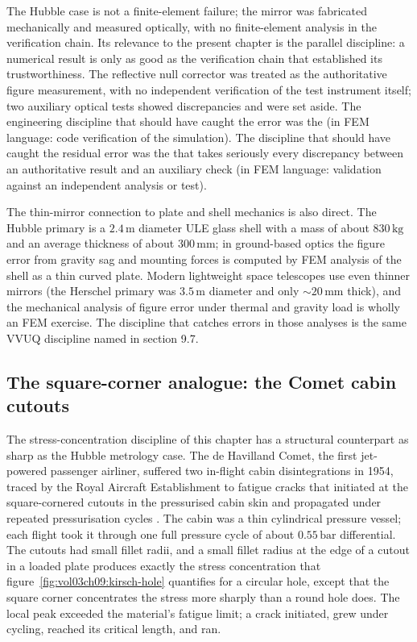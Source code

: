 The Hubble case is not a finite-element failure; the mirror was
fabricated mechanically and measured optically, with no
finite-element analysis in the verification chain. Its relevance
to the present chapter is the parallel discipline: a numerical
result is only as good as the verification chain that established
its trustworthiness. The reflective null corrector was treated as
the authoritative figure measurement, with no independent
verification of the test instrument itself; two auxiliary optical
tests showed discrepancies and were set aside. The engineering
discipline that should have caught the error was the
 (in FEM
language: code verification of the simulation). The discipline
that should have caught the residual error was the
 that takes seriously every
discrepancy between an authoritative result and an auxiliary
check (in FEM language: validation against an independent
analysis or test).

The thin-mirror connection to plate and shell mechanics is also
direct. The Hubble primary is a $2.4 \,\text{m}$ diameter ULE
glass shell with a mass of about $830 \,\si{\kilogram}$ and an
average thickness of about $300\,\si{\milli\meter}$; in
ground-based optics the figure error from gravity sag and
mounting forces is computed by FEM analysis of the shell as a
thin curved plate. Modern lightweight space telescopes use even
thinner mirrors (the Herschel primary was $3.5 \,\text{m}$
diameter and only $\sim 20\,\si{\milli\meter}$ thick), and the
mechanical analysis of figure error under thermal and gravity
load is wholly an FEM exercise. The discipline that catches
errors in those analyses is the same VVUQ discipline named in
section 9.7.

\subsection{The square-corner analogue: the Comet cabin cutouts}

The stress-concentration discipline of this chapter has a structural
counterpart as sharp as the Hubble metrology case. The de Havilland
Comet, the first jet-powered passenger airliner, suffered two in-flight
cabin disintegrations in 1954, traced by the Royal Aircraft
Establishment to fatigue cracks that initiated at the square-cornered
cutouts in the pressurised cabin skin and propagated under repeated
pressurisation cycles \cite{acc:cohen-comet-report-1955}. The cabin
was a thin cylindrical pressure vessel; each flight took it through one
full pressure cycle of about $0.55\,\si{\bar}$ differential. The
cutouts had small fillet radii, and a small fillet radius at the edge
of a cutout in a loaded plate produces exactly the stress
concentration that figure~\ref{fig:vol03ch09:kirsch-hole} quantifies
for a circular hole, except that the square corner concentrates the
stress more sharply than a round hole does. The local peak exceeded
the material's fatigue limit; a crack initiated, grew under cycling,
reached its critical length, and ran.


